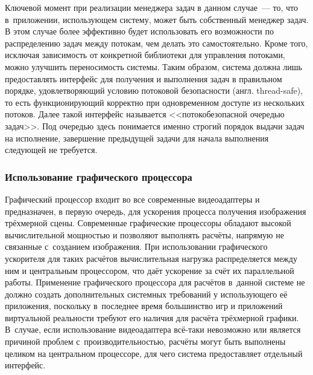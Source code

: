 \documentclass[a4paper, 14pt, titlepage]{extarticle}
\newcommand{\eng}[1]{{\English #1}}
\begin{document}
        Ключевой момент при реализации менеджера задач в данном случае~--- то, что в~приложении,
        использующем систему, может быть собственный менеджер задач. В этом случае более эффективно
        будет использовать его возможности по распределению задач между потокам, чем делать это
        самостоятельно. Кроме того, исключая зависимость от конкретной библиотеки для управления
        потоками, можно улучшить переносимость системы. Таким образом, система должна лишь
        предоставлять интерфейс для получения и выполнения задач в правильном порядке,
        удовлетворяющий условию потоковой безопасности (англ. \eng{thread-safe}), то есть
        функционирующий корректно при одновременном доступе из нескольких потоков. Далее такой
        интерфейс называется <<потокобезопасной очередью задач>>. Под очередью здесь понимается именно строгий порядок выдачи
        задач на исполнение, завершение предыдущей задачи для начала выполнения следующей не требуется.

      \subsubsection{Использование графического процессора}\label{sssec:using_gpu}

        Графический процессор входит во все современные видеоадаптеры и предназначен, в
        первую очередь, для ускорения процесса получения изображения трёхмерной сцены. Современные
        графические процессоры обладают высокой вычислительной мощностью и позволяют выполнять
        расчёты, напрямую не связанные с~созданием изображения. При использовании графического
        ускорителя для таких расчётов вычислительная нагрузка распределяется между ним и центральным
        процессором, что даёт ускорение за счёт их параллельной работы. Применение графического
        процессора для расчётов в~данной системе не должно создать дополнительных системных
        требований у использующего её приложения, поскольку в~последнее время большинство игр и
        приложений виртуальной реальности требуют его наличия для расчёта трёхмерной графики. В~случае, если
        использование видеоадаптера всё-таки невозможно или является причиной проблем
        с~производительностью, расчёты могут быть выполнены целиком на центральном процессоре, для
        чего система предоставляет отдельный интерфейс.
\end{document}
